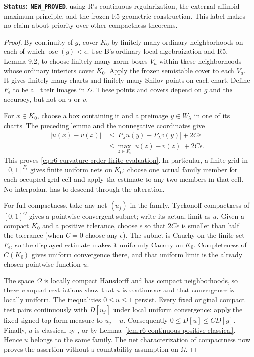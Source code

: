\documentclass[11pt,a4paper]{article}
\numberwithin{equation}{section}
\theoremstyle{definition}
\theoremstyle{remark}
\begin{document}
\noindent\textbf{Status: \texttt{NEW\_PROVED}}, using R's
continuous regularization, the external affinoid maximum principle,
and the frozen R5 geometric construction. This label makes no
claim about priority over other compactness theorems.

\begin{proof}
By continuity of $g$, cover $K_0$ by finitely many ordinary
neighborhoods on each of which $\operatorname{osc}(g)<\epsilon$.
Use B's ordinary local algebraization and R5, Lemma 9.2, to choose
finitely many norm boxes $V_a$ within these neighborhoods whose
ordinary interiors cover $K_0$. Apply the frozen semistable cover
to each $V_a$. It gives finitely many charts and finitely many
Shilov points on each chart. Define $F_\epsilon$ to be all their
images in $\Omega$. These points and covers depend on $g$ and the
accuracy, but not on $u$ or $v$.

For $x\in K_0$, choose a box containing it and a preimage
$y\in W_\lambda$ in one of its charts. The preceding lemma and
the nonnegative coordinates give
\begin{align*}
 |u(x)-v(x)|
 &\leq |P_\lambda u(y)-P_\lambda v(y)|+2C\epsilon\\
 &\leq \max_{z\in F_\epsilon}|u(z)-v(z)|+2C\epsilon.
\end{align*}
This proves \eqref{eq:r6-curvature-order-finite-evaluation}. In
particular, a finite grid in $[0,1]^{F_\epsilon}$ gives finite
uniform nets on $K_0$: choose one actual family member for each
occupied grid cell and apply the estimate to any two members in
that cell. No interpolant has to descend through the alteration.

For full compactness, take any net $(u_j)$ in the family. Tychonoff
compactness of $[0,1]^\Omega$ gives a pointwise convergent subnet;
write its actual limit as $u$. Given a compact $K_0$ and a positive
tolerance, choose $\epsilon$ so that $2C\epsilon$ is smaller than
half the tolerance (when $C=0$ choose any $\epsilon$). The subnet
is Cauchy on the finite set $F_\epsilon$, so the displayed estimate
makes it uniformly Cauchy on $K_0$. Completeness of $C(K_0)$ gives
uniform convergence there, and that uniform limit is the already
chosen pointwise function $u$.

The space $\Omega$ is locally compact Hausdorff and has compact
neighborhoods, so these compact restrictions show that $u$ is
continuous and that convergence is locally uniform. The inequalities
$0\leq u\leq1$ persist. Every fixed original compact test pairs
continuously with $D[u_j]$ under local uniform convergence: apply
the fixed signed top-form measure to $u_j-u$. Consequently
$0\leq D[u]\leq C D[g]$. Finally, $u$ is classical by
\cite[Theorem 6.5]{GR25}, or by
Lemma~\ref{lem:r6-continuous-positive-classical}. Hence $u$ belongs
to the same family. The net characterization of compactness now
proves the assertion without a countability assumption on $\Omega$.
\end{proof}
\end{document}
